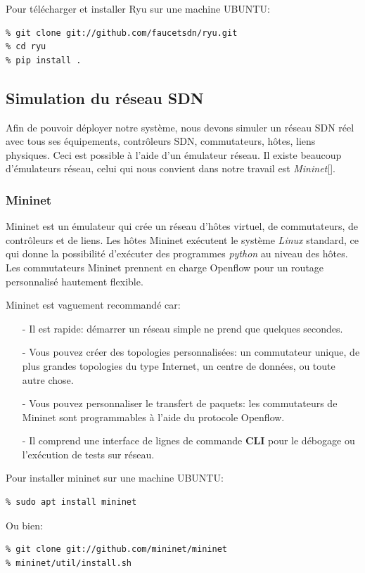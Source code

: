 \noindent Pour télécharger et installer Ryu sur une machine UBUNTU:
\begin{verbatim}
% git clone git://github.com/faucetsdn/ryu.git
% cd ryu
% pip install .
\end{verbatim}


\subsection{Simulation du réseau SDN}
Afin de pouvoir déployer notre système, nous devons simuler un réseau SDN réel avec tous ses équipements, contrôleurs SDN, commutateurs, hôtes, liens physiques. Ceci est possible à l'aide d'un émulateur réseau. Il existe beaucoup d'émulateurs réseau, celui qui nous convient dans notre travail est \textit{Mininet}[\cite{28}].

\subsubsection{Mininet}
Mininet est un émulateur qui crée un réseau d’hôtes virtuel, de commutateurs, de contrôleurs et de liens. Les hôtes Mininet exécutent le système \textit{Linux} standard, ce qui donne la possibilité d'exécuter des programmes \textit{python} au niveau des hôtes. Les commutateurs Mininet prennent en charge Openflow pour un routage personnalisé hautement flexible.

\noindent Mininet est vaguement recommandé car:\\
\begin{itemize}
\item[-] Il est rapide: démarrer un réseau simple ne prend que quelques secondes.\\
\item[-] Vous pouvez créer des topologies personnalisées: un commutateur unique, de plus grandes topologies du type Internet, un centre de données, ou toute autre chose.\\
\item[-] Vous pouvez personnaliser le transfert de paquets: les commutateurs de Mininet sont programmables à l’aide du protocole Openflow.\\
\item[-] Il comprend une interface de lignes de commande \textbf{CLI} pour le débogage ou l’exécution de tests sur réseau.\\
\end{itemize}

\noindent Pour installer mininet sur une machine UBUNTU:
\begin{verbatim}
% sudo apt install mininet
\end{verbatim}
Ou bien: 
\begin{verbatim}
% git clone git://github.com/mininet/mininet
% mininet/util/install.sh
\end{verbatim}

